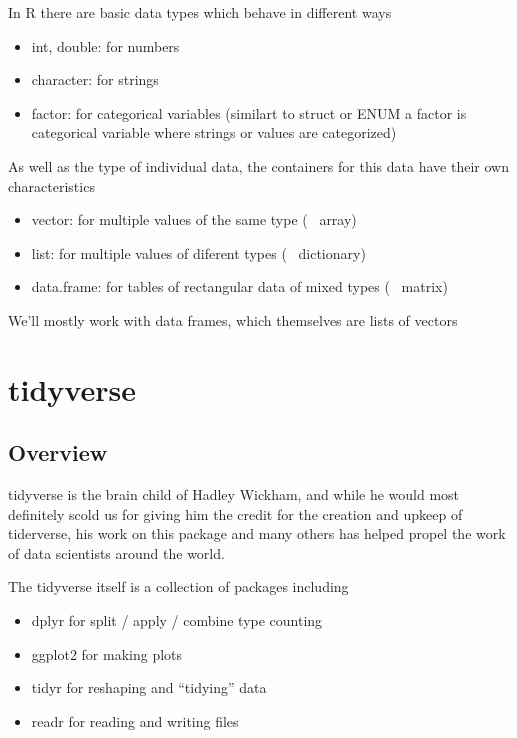 \begin{flushleft}
In R there are basic data types which behave in different ways

\begin{itemize}
    \item int, double: for numbers
    \item character: for strings
    \item factor: for categorical variables (similart to struct or ENUM a factor is categorical variable where strings or values are categorized) 
\end{itemize}

As well as the type of individual data, the containers for this data have their own characteristics 

\begin{itemize}
    \item vector: for multiple values of the same type (~ array)
    \item list: for multiple values of diferent types (~ dictionary)
    \item data.frame: for tables of rectangular data of mixed types (~ matrix)
\end{itemize}

We'll mostly work with data frames, which themselves are lists of vectors

\end{flushleft}


\section{tidyverse}
\subsection{Overview}

\begin{flushleft}
tidyverse is the brain child of Hadley Wickham, and while he would most definitely scold us for giving him the credit for the creation and upkeep of tiderverse, his work on this package and many others has helped propel the work of data scientists around the world.
\end{flushleft}

\begin{flushleft}
The tidyverse itself is a collection of packages including
\begin{itemize}
    \item dplyr for split / apply / combine type counting
    \item ggplot2 for making plots
    \item tidyr for reshaping and “tidying” data
    \item readr for reading and writing files
\end{itemize}

\end{flushleft}

